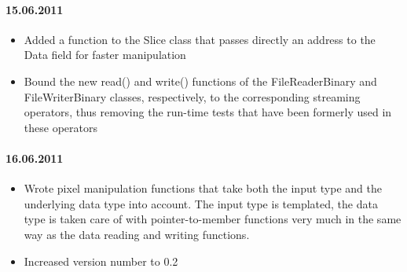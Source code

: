 \documentclass[a4paper,11pt]{article}
\begin{document}
\paragraph{15.06.2011}
%
\begin{itemize}
%
\item{Added a function to the Slice class that passes directly an address to the Data field for faster manipulation}
%
\item{Bound the new read() and write() functions of the FileReaderBinary and FileWriterBinary classes, respectively, to
the corresponding streaming operators, thus removing the run-time tests that have been formerly used in these operators}
%
\end{itemize}
%
%
\paragraph{16.06.2011}
%
\begin{itemize}
%
\item{Wrote pixel manipulation functions that take both the input type and the underlying data type into account. The
input type is templated, the data type is taken care of with pointer-to-member functions very much in the same way as
the data reading and writing functions.}
%
\item{Increased version number to 0.2}
%
\end{itemize}
%
\end{document}
